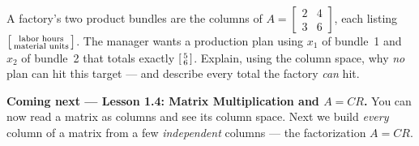 \documentclass[10pt]{article}
\begin{document}
\begin{extensionbox}
A factory's two product bundles are the columns of $A=\begin{bmatrix} 2 & 4 \\ 3 & 6 \end{bmatrix}$,
each listing $\begin{bsmallmatrix} \text{labor hours} \\ \text{material units} \end{bsmallmatrix}$.
The manager wants a production plan using $x_1$ of bundle~1 and $x_2$ of bundle~2 that totals
exactly $\begin{bsmallmatrix} 5 \\ 6 \end{bsmallmatrix}$. Explain, using the column space, why
\emph{no} plan can hit this target --- and describe every total the factory \emph{can} hit.
\end{extensionbox}

\begin{spiralbox}
\textbf{Coming next --- Lesson 1.4: Matrix Multiplication and $A=CR$.} You can now read a matrix as
columns and see its column space. Next we build \emph{every} column of a matrix from a few
\emph{independent} columns --- the factorization $A=CR$.
\end{spiralbox}
\end{document}
